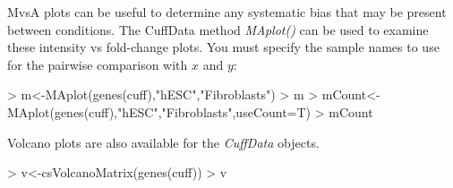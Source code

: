 \documentclass[10pt]{article}
\newcommand{\Rclass}[1]{{\textit{#1}}}
\newcommand{\Rmethod}[1]{{\textit{#1}}}
\begin{document}
\begin{figure}[htp]
	\begin{center}
	\qquad
	\end{center}
\end{figure}

MvsA plots can be useful to determine any systematic bias that may be present between conditions. The CuffData method \Rmethod{MAplot()} can be used to examine these intensity vs fold-change plots. You must specify the sample names to use for the pairwise comparison with $x$ and $y$:
\begin{Schunk}
\begin{Sinput}
> m<-MAplot(genes(cuff),"hESC","Fibroblasts")
> m
> mCount<-MAplot(genes(cuff),"hESC","Fibroblasts",useCount=T)
> mCount
\end{Sinput}
\end{Schunk}

\begin{figure}[htp]
	\begin{center}
	
	\qquad
	\end{center}
\end{figure}

Volcano plots are also available for the \Rclass{CuffData} objects. 

\begin{Schunk}
\begin{Sinput}
> v<-csVolcanoMatrix(genes(cuff))
> v
\end{Sinput}
\end{Schunk}
\begin{figure}[htp]
	\begin{center}
	\end{center}
\end{figure}
\end{document}
